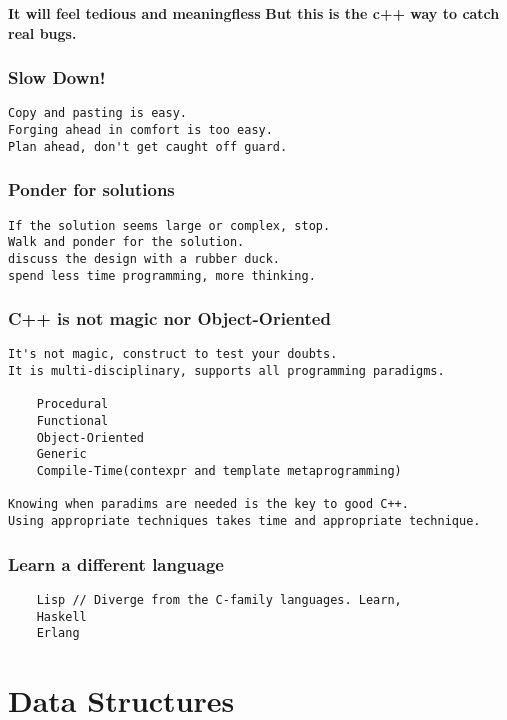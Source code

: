 \documentclass[openany]{report}
\begin{document}
\textbf{It will feel tedious and meaningfless}
\textbf{But this is the c++ way to catch real bugs.}

\subsection{Slow Down!}

\begin{verbatim}
Copy and pasting is easy. 
Forging ahead in comfort is too easy.
Plan ahead, don't get caught off guard. 
\end{verbatim}

\subsection{Ponder for solutions}

\begin{verbatim}
If the solution seems large or complex, stop. 
Walk and ponder for the solution. 
discuss the design with a rubber duck. 
spend less time programming, more thinking.
\end{verbatim}

\subsection{C++ is not magic nor Object-Oriented}

\begin{verbatim}
It's not magic, construct to test your doubts.
It is multi-disciplinary, supports all programming paradigms.

    Procedural
    Functional
    Object-Oriented
    Generic
    Compile-Time(contexpr and template metaprogramming)

Knowing when paradims are needed is the key to good C++.
Using appropriate techniques takes time and appropriate technique. 
\end{verbatim}

\subsection{Learn a different language}

\begin{verbatim}
    Lisp // Diverge from the C-family languages. Learn,
    Haskell
    Erlang
\end{verbatim}



\chapter{Data Structures}
\end{document}
